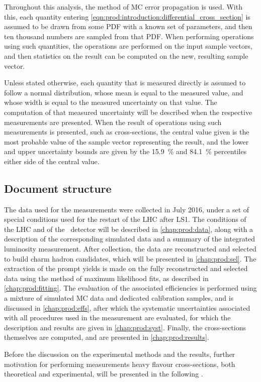 Throughout this analysis, the method of \acl{MC} error propagation is used.
With this, each quantity entering 
\cref{eqn:prod:introduction:differential_cross_section} is assumed to be drawn 
from some \acf{PDF} with a known set of parameters, and then ten thousand 
numbers are sampled from that \ac{PDF}.
When performing operations using such quantities, the operations are performed 
on the input sample vectors, and then statistics on the result can be computed 
on the new, resulting sample vector.

Unless stated otherwise, each quantity that is measured directly is assumed to 
follow a normal distribution, whose mean is equal to the measured value, and 
whose width is equal to the measured uncertainty on that value.
The computation of that measured uncertainty will be described when the 
respective measurements are presented.
When the result of operations using such measurements is presented, such as 
cross-sections, the central value given is the most probable value of the 
sample vector representing the result, and the lower and upper uncertainty 
bounds are given by the \SI{15.9}{\percent} and \SI{84.1}{\percent} percentiles 
either side of the central value.


\subsection{Document structure}
\label{chap:prod:introduction:structure}

The data used for the measurements were collected in July 2016, under a set of 
special conditions used for the restart of the \ac{LHC} after \ac{LS1}.
The conditions of the \ac{LHC} and of the \lhcb\ detector will be described in 
\cref{chap:prod:data}, along with a description of the corresponding simulated 
data and a summary of the integrated luminosity measurement.
After collection, the data are reconstructed and selected to build charm hadron 
candidates, which will be presented in \cref{chap:prod:sel}.
The extraction of the prompt yields is made on the fully reconstructed and 
selected data using the method of maximum likelihood fits, as described in 
\cref{chap:prod:fitting}.
The evaluation of the associated efficiencies is performed using a mixture of 
simulated \acl{MC} data and dedicated calibration samples, and is discussed in 
\cref{chap:prod:effs}, after which the systematic uncertainties associated with 
all procedures used in the measurement are evaluated, for which the description 
and results are given in \cref{chap:prod:syst}.
Finally, the cross-sections themselves are computed, and are presented in 
\cref{chap:prod:results}.

Before the discussion on the experimental methods and the results, further 
motivation for performing measurements heavy flavour cross-sections, both 
theoretical and experimental, will be presented in the following 
.
